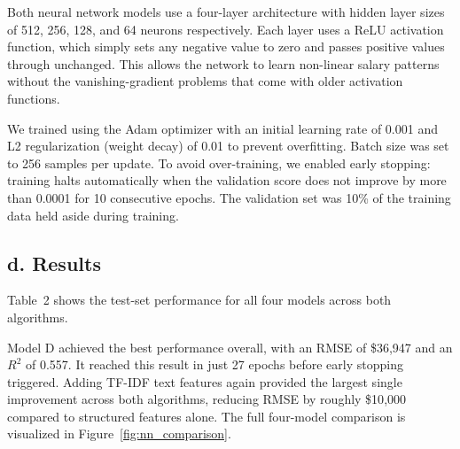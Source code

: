 \documentclass[11pt]{article}
\begin{document}
Both neural network models use a four-layer architecture with hidden layer sizes of 512, 256, 128, and 64 neurons respectively. Each layer uses a ReLU activation function, which simply sets any negative value to zero and passes positive values through unchanged. This allows the network to learn non-linear salary patterns without the vanishing-gradient problems that come with older activation functions.

We trained using the Adam optimizer with an initial learning rate of 0.001 and L2 regularization (weight decay) of 0.01 to prevent overfitting. Batch size was set to 256 samples per update. To avoid over-training, we enabled early stopping: training halts automatically when the validation score does not improve by more than 0.0001 for 10 consecutive epochs. The validation set was 10\% of the training data held aside during training.

\subsection*{d. Results}

Table~2 shows the test-set performance for all four models across both algorithms.

\begin{table}[h]
\centering
{}
\caption{Test-set performance across all four models (10{,}000 sample).}
\label{tab:nn_results}
\end{table}

Model D achieved the best performance overall, with an RMSE of \$36{,}947 and an $R^2$ of 0.557. It reached this result in just 27 epochs before early stopping triggered. Adding TF-IDF text features again provided the largest single improvement across both algorithms, reducing RMSE by roughly \$10{,}000 compared to structured features alone. The full four-model comparison is visualized in Figure~\ref{fig:nn_comparison}.
\end{document}
